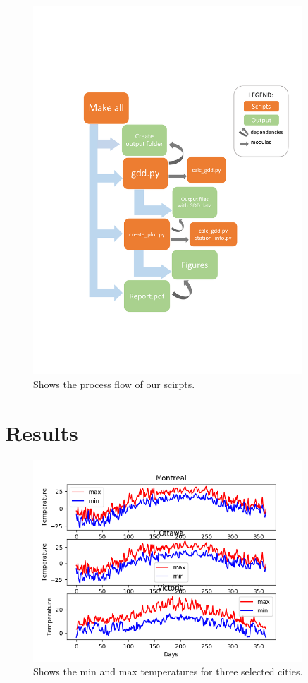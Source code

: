 \documentclass[12pt]{article}
\begin{document}
	\begin{figure}[!htbp]
		\centering
		\includegraphics[width=0.9\textwidth]{./Report/diagram_workflow.pdf} 
		\caption{\scriptsize Shows the process flow of our scirpts.}\label{flowplot}		  
	\end{figure}


\pagebreak
\section{Results}

	\begin{figure}[!htbp]
		\centering
		\includegraphics[width=0.9\textwidth]{./Output/CompareMaxMinTemp.png} 
		\caption{\scriptsize Shows the min and max temperatures for three selected cities.}\label{MinMaxplot}		  
	\end{figure}
\end{document}
